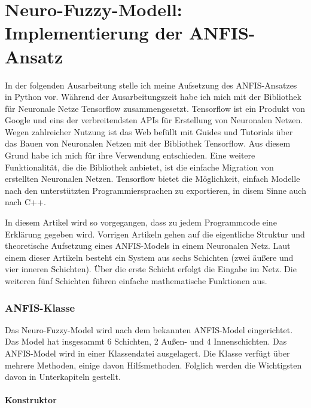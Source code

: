 \chapter{Neuro-Fuzzy-Modell: Implementierung der
ANFIS-Ansatz}\label{neuro-fuzzy-modell-implementierung-der-anfis-ansatz}

In der folgenden Ausarbeitung stelle ich meine Aufsetzung des
ANFIS-Ansatzes in Python vor. Während der Ausarbeitungszeit habe ich mich
mit der Bibliothek für Neuronale Netze Tensorflow zusammengesetzt.
Tensorflow ist ein Produkt von Google und eins der verbreitendsten APIs
für Erstellung von Neuronalen Netzen. Wegen zahlreicher Nutzung ist das
Web befüllt mit Guides und Tutorials über das Bauen von Neuronalen
Netzen mit der Bibliothek Tensorflow. Aus diesem Grund habe ich mich für
ihre Verwendung entschieden. Eine weitere Funktionalität, die die
Bibliothek anbietet, ist die einfache Migration von erstellten
Neuronalen Netzen. Tensorflow bietet die Möglichkeit, einfach Modelle
nach den unterstützten Programmiersprachen zu exportieren, in disem
Sinne auch nach C++.

In diesem Artikel wird so vorgegangen, dass zu jedem Programmcode eine
Erklärung gegeben wird. Vorrigen Artikeln gehen auf die eigentliche
Struktur und theoretische Aufsetzung eines ANFIS-Models in einem
Neuronalen Netz. Laut einem dieser Artikeln besteht ein System aus sechs
Schichten (zwei äußere und vier inneren Schichten). Über die erste
Schicht erfolgt die Eingabe im Netz. Die weiteren fünf Schichten führen
einfache mathematische Funktionen aus.

\hypertarget{anfis-klasse}{%
\subsection{ANFIS-Klasse}\label{anfis-klasse}}

Das Neuro-Fuzzy-Model wird nach dem bekannten ANFIS-Model eingerichtet.
Das Model hat insgesammt 6 Schichten, 2 Außen- und 4 Innenschichten. Das
ANFIS-Model wird in einer Klassendatei ausgelagert. Die Klasse verfügt
über mehrere Methoden, einige davon Hilfsmethoden. Folglich werden die
Wichtigsten davon in Unterkapiteln gestellt.

\hypertarget{konstruktor}{%
\subsubsection{Konstruktor}\label{konstruktor}}

